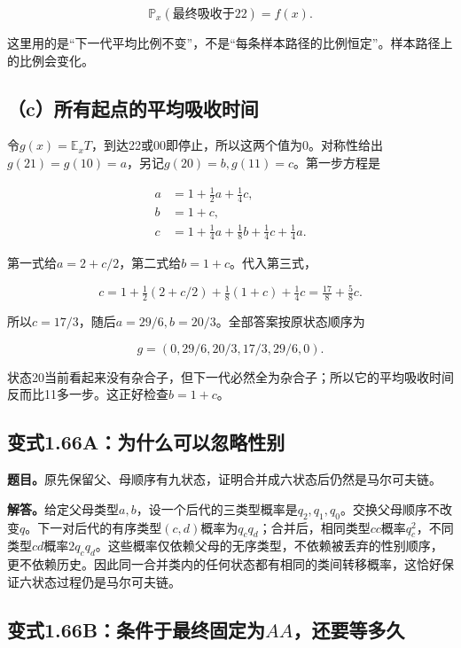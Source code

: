 \documentclass[
  11pt,a4paper,UTF8,fontset=fandol]{ctexart}
\begin{document}
\[\boxed{\mathbb P_x(\text{最终吸收于22})=f(x).}\]

这里用的是``下一代平均比例不变''，不是``每条样本路径的比例恒定''。样本路径上的比例会变化。

\subsection{（c）所有起点的平均吸收时间}\label{cux6240ux6709ux8d77ux70b9ux7684ux5e73ux5747ux5438ux6536ux65f6ux95f4}

令\(g(x)=\mathbb E_xT\)，到达22或00即停止，所以这两个值为0。对称性给出\(g(21)=g(10)=a\)，另记\(g(20)=b,g(11)=c\)。第一步方程是

\[
\begin{aligned}
a&=1+\tfrac12a+\tfrac14c,\\
b&=1+c,\\
c&=1+\tfrac14a+\tfrac18b+\tfrac14c+\tfrac14a.
\end{aligned}
\]

第一式给\(a=2+c/2\)，第二式给\(b=1+c\)。代入第三式，

\[c=1+\tfrac12(2+c/2)+\tfrac18(1+c)+\tfrac14c
=\tfrac{17}{8}+\tfrac58c.\]

所以\(c=17/3\)，随后\(a=29/6,b=20/3\)。全部答案按原状态顺序为

\[\boxed{g=(0,29/6,20/3,17/3,29/6,0).}\]

状态20当前看起来没有杂合子，但下一代必然全为杂合子；所以它的平均吸收时间反而比11多一步。这正好检查\(b=1+c\)。

\subsection{变式1.66A：为什么可以忽略性别}\label{ux53d8ux5f0f1.66aux4e3aux4ec0ux4e48ux53efux4ee5ux5ffdux7565ux6027ux522b}

\textbf{题目。}原先保留父、母顺序有九状态，证明合并成六状态后仍然是马尔可夫链。

\textbf{解答。}给定父母类型\(a,b\)，设一个后代的三类型概率是\(q_2,q_1,q_0\)。交换父母顺序不改变\(q\)。下一对后代的有序类型\((c,d)\)概率为\(q_cq_d\)；合并后，相同类型\(cc\)概率\(q_c^2\)，不同类型\(cd\)概率\(2q_cq_d\)。这些概率仅依赖父母的无序类型，不依赖被丢弃的性别顺序，更不依赖历史。因此同一合并类内的任何状态都有相同的类间转移概率，这恰好保证六状态过程仍是马尔可夫链。

\subsection{\texorpdfstring{变式1.66B：条件于最终固定为\(AA\)，还要等多久}{变式1.66B：条件于最终固定为AA，还要等多久}}\label{ux53d8ux5f0f1.66bux6761ux4ef6ux4e8eux6700ux7ec8ux56faux5b9aux4e3aaaux8fd8ux8981ux7b49ux591aux4e45}
\end{document}
